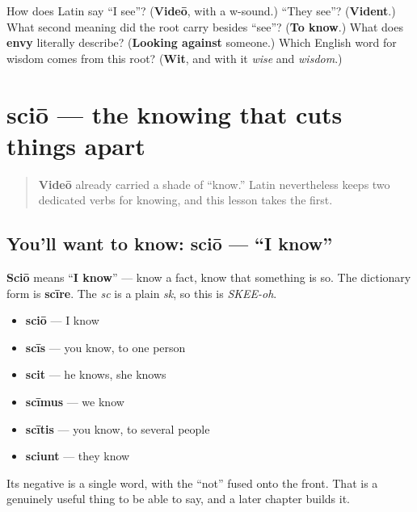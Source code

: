 \begin{tcolorbox}[breakable,colback=teal!4,colframe=teal!35!black,title={Before you move on}]
How does Latin say \textquotedblleft{}I see\textquotedblright{}? (\textbf{Videō}, with a w-sound.) \textquotedblleft{}They see\textquotedblright{}? (\textbf{Vident}.) What second meaning did the root carry besides \textquotedblleft{}see\textquotedblright{}? (\textbf{To know}.) What does \textbf{envy} literally describe? (\textbf{Looking against} someone.) Which English word for wisdom comes from this root? (\textbf{Wit}, and with it \emph{wise} and \emph{wisdom}.)
\end{tcolorbox}
\section[sciō, scīre]{sciō — the knowing that cuts things apart}

\label{lesson:LA-C37-scio}



\begin{quote}
\textbf{Videō} already carried a shade of \textquotedblleft{}know.\textquotedblright{} Latin nevertheless keeps two dedicated verbs for knowing, and this lesson takes the first.
\end{quote}

\subsection*{You'll want to know: sciō — \textquotedblleft{}I know\textquotedblright{}}
\textbf{Sciō} means \textquotedblleft{}\textbf{I know}\textquotedblright{} — know a fact, know that something is so. The dictionary form is \textbf{scīre}. The \emph{sc} is a plain \emph{sk}, so this is \emph{SKEE-oh}.

\begin{itemize}
\raggedright
  \item \textbf{sciō} — I know
  \item \textbf{scīs} — you know, to one person
  \item \textbf{scit} — he knows, she knows
  \item \textbf{scīmus} — we know
  \item \textbf{scītis} — you know, to several people
  \item \textbf{sciunt} — they know
\end{itemize}

Its negative is a single word, with the \textquotedblleft{}not\textquotedblright{} fused onto the front. That is a genuinely useful thing to be able to say, and a later chapter builds it.

